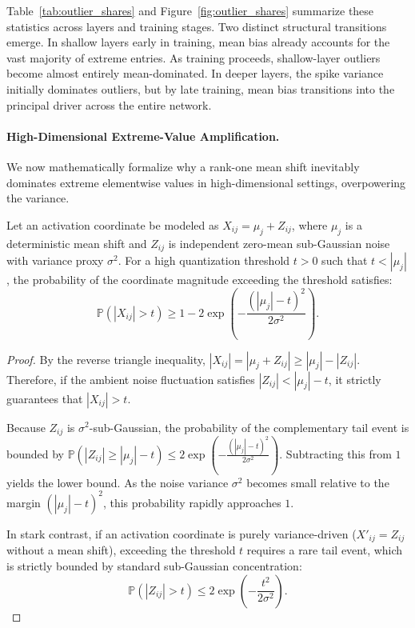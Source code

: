 Table~\ref{tab:outlier_shares} and Figure~\ref{fig:outlier_shares} summarize these statistics across layers and training stages. Two distinct structural transitions emerge. In shallow layers early in training, mean bias already accounts for the vast majority of extreme entries. As training proceeds, shallow-layer outliers become almost entirely mean-dominated. In deeper layers, the spike variance initially dominates outliers, but by late training, mean bias transitions into the principal driver across the entire network.

\paragraph{High-Dimensional Extreme-Value Amplification.} 
We now mathematically formalize why a rank-one mean shift inevitably dominates extreme elementwise values in high-dimensional settings, overpowering the variance.

\begin{theorem}
\label{thm:extreme_dominance}
Let an activation coordinate be modeled as $X_{ij} = \mu_j + Z_{ij}$, where $\mu_j$ is a deterministic mean shift and $Z_{ij}$ is independent zero-mean sub-Gaussian noise with variance proxy $\sigma^2$. For a high quantization threshold $t > 0$ such that $t < |\mu_j|$, the probability of the coordinate magnitude exceeding the threshold satisfies:
\begin{equation}
\mathbb{P}(|X_{ij}| > t) \ge 1 - 2\exp\left(-\frac{(|\mu_j| - t)^2}{2\sigma^2}\right).
\end{equation}
\end{theorem}

\begin{proof}
By the reverse triangle inequality, $|X_{ij}| = |\mu_j + Z_{ij}| \ge |\mu_j| - |Z_{ij}|$. Therefore, if the ambient noise fluctuation satisfies $|Z_{ij}| < |\mu_j| - t$, it strictly guarantees that $|X_{ij}| > t$. 

Because $Z_{ij}$ is $\sigma^2$-sub-Gaussian, the probability of the complementary tail event is bounded by $\mathbb{P}(|Z_{ij}| \ge |\mu_j| - t) \le 2\exp\left(-\frac{(|\mu_j| - t)^2}{2\sigma^2}\right)$. Subtracting this from $1$ yields the lower bound. As the noise variance $\sigma^2$ becomes small relative to the margin $(|\mu_j| - t)^2$, this probability rapidly approaches $1$.

In stark contrast, if an activation coordinate is purely variance-driven ($X'_{ij} = Z_{ij}$ without a mean shift), exceeding the threshold $t$ requires a rare tail event, which is strictly bounded by standard sub-Gaussian concentration:
\begin{equation}
\mathbb{P}(|Z_{ij}| > t) \le 2\exp\left(-\frac{t^2}{2\sigma^2}\right).
\end{equation}
\end{proof}

